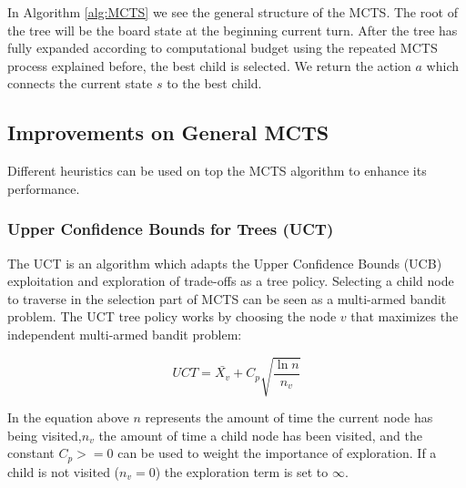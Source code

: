 \documentclass{ba-kecs}
\begin{document}
In Algorithm \ref{alg:MCTS} we see the general structure of the MCTS. The root of the tree will be the board state at the beginning current turn. After the tree has fully expanded according to computational budget using the repeated MCTS process explained before, the best child is selected. We return the action $a$ which connects the current state $s$ to the best child.
\subsection{Improvements on General MCTS}
Different heuristics can be used on top the MCTS algorithm to enhance its performance.
\subsubsection{Upper Confidence Bounds for Trees (UCT)}
The UCT is an algorithm which adapts the Upper Confidence Bounds (UCB) exploitation and exploration of trade-offs as a tree policy. 
Selecting a child node to traverse in the selection part of MCTS can be seen as a multi-armed bandit problem.
The UCT tree policy works by choosing the node $v$ that maximizes the independent multi-armed bandit problem:
\begin{center}
\begin{equation}
	UCT = \bar{X_v} + C_p \sqrt{\frac{\ln n}{n_v}}
\end{equation}
\end{center}
In the equation above $n$ represents the amount of time the current node has being visited,$n_v$ the amount of time a  child node has been visited, and the constant $C_p >=0 $ can be used to weight the importance of exploration. If a child is not visited ($n_v = 0$) the exploration term is set to $\infty$.
\end{document}
